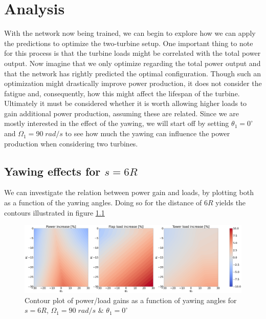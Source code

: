 \chapter{Analysis}
\label{chap:analysis}

With the network now being trained, we can begin to explore how we can apply the predictions to optimize the two-turbine setup. One important thing to note for this process is that the turbine loads might be correlated with the total power output. Now imagine that we only optimize regarding the total power output and that the network has rightly predicted the optimal configuration. Though such an optimization might drastically improve power production, it does not consider the fatigue and, consequently, how this might affect the lifespan of the turbine. Ultimately it must be considered whether it is worth allowing higher loads to gain additional power production, assuming these are related. Since we are mostly interested in the effect of the yawing, we will start off by setting $\theta_1=0^\circ$ and $\Omega_1=90 \; rad/s$ to see how much the yawing can influence the power production when considering two turbines.

\section{Yawing effects for $s=6R$}
\label{sec:label_s6R}

We can investigate the relation between power gain and loads, by plotting both as a function of the yawing angles. Doing so for the distance of $6R$ yields the contours illustrated in figure \ref{fig:gaincontour6r}

\begin{figure}[H]
    \centering
    \includegraphics[scale=0.14]{Illustrations/yaw1_yaw2_lockedturbine.png}
    \caption{Contour plot of power/load gains as a function of yawing angles for $s=6R$, $\Omega_1=90 \; rad/s$ $\&$ $\theta_1=0^\circ$}
    \label{fig:gaincontour6r}
\end{figure}


